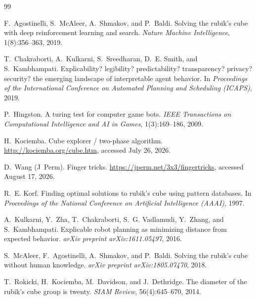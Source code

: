 \documentclass[10pt,conference]{article}
\begin{document}

\begin{thebibliography}{99}

F.~Agostinelli, S.~McAleer, A.~Shmakov, and P.~Baldi.
\newblock Solving the rubik's cube with deep reinforcement learning and
  search.
\newblock \emph{Nature Machine Intelligence}, 1(8):356--363, 2019.

T.~Chakraborti, A.~Kulkarni, S.~Sreedharan, D.~E. Smith, and
S.~Kambhampati.
\newblock Explicability? legibility? predictability? transparency?
  privacy? security? the emerging landscape of interpretable agent
  behavior.
\newblock In \emph{Proceedings of the International Conference on
  Automated Planning and Scheduling (ICAPS)}, 2019.

P.~Hingston.
\newblock A turing test for computer game bots.
\newblock \emph{IEEE Transactions on Computational Intelligence and AI
  in Games}, 1(3):169--186, 2009.

H.~Kociemba.
\newblock Cube explorer / two-phase algorithm.
\newblock \url{http://kociemba.org/cube.htm}, accessed July 26, 2026.

D.~Wang (J~Perm).
\newblock Finger tricks.
\newblock \url{https://jperm.net/3x3/fingertricks}, accessed August 17, 2026.

R.~E. Korf.
\newblock Finding optimal solutions to rubik's cube using pattern
  databases.
\newblock In \emph{Proceedings of the National Conference on
  Artificial Intelligence (AAAI)}, 1997.

A.~Kulkarni, Y.~Zha, T.~Chakraborti, S.~G. Vadlamudi, Y.~Zhang, and
S.~Kambhampati.
\newblock Explicable robot planning as minimizing distance from
  expected behavior.
\newblock \emph{arXiv preprint arXiv:1611.05497}, 2016.

S.~McAleer, F.~Agostinelli, A.~Shmakov, and P.~Baldi.
\newblock Solving the rubik's cube without human knowledge.
\newblock \emph{arXiv preprint arXiv:1805.07470}, 2018.

T.~Rokicki, H.~Kociemba, M.~Davidson, and J.~Dethridge.
\newblock The diameter of the rubik's cube group is twenty.
\newblock \emph{SIAM Review}, 56(4):645--670, 2014.


\end{thebibliography}
\end{document}
